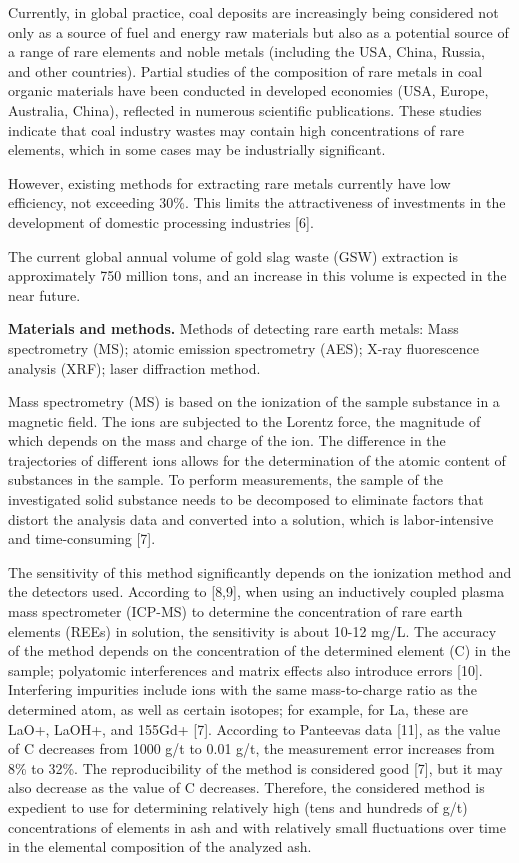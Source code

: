 \begin{multicols}{2}
Currently, in global practice, coal deposits are increasingly being
considered not only as a source of fuel and energy raw materials but
also as a potential source of a range of rare elements and noble metals
(including the USA, China, Russia, and other countries). Partial studies
of the composition of rare metals in coal organic materials have been
conducted in developed economies (USA, Europe, Australia, China),
reflected in numerous scientific publications. These studies indicate
that coal industry wastes may contain high concentrations of rare
elements, which in some cases may be industrially significant.

However, existing methods for extracting rare metals currently have low
efficiency, not exceeding 30\%. This limits the attractiveness of
investments in the development of domestic processing industries
{[}6{]}.

The current global annual volume of gold slag waste (GSW) extraction is
approximately 750 million tons, and an increase in this volume is
expected in the near future.

{\bfseries Materials and methods.} Methods of detecting rare earth metals:
Mass spectrometry (MS); atomic emission spectrometry (AES); X-ray
fluorescence analysis (XRF); laser diffraction method.

Mass spectrometry (MS) is based on the ionization of the sample
substance in a magnetic field. The ions are subjected to the Lorentz
force, the magnitude of which depends on the mass and charge of the ion.
The difference in the trajectories of different ions allows for the
determination of the atomic content of substances in the sample. To
perform measurements, the sample of the investigated solid substance
needs to be decomposed to eliminate factors that distort the analysis
data and converted into a solution, which is labor-intensive and
time-consuming {[}7{]}.

The sensitivity of this method significantly depends on the ionization
method and the detectors used. According to {[}8,9{]}, when using an
inductively coupled plasma mass spectrometer (ICP-MS) to determine the
concentration of rare earth elements (REEs) in solution, the sensitivity
is about 10-12 mg/L. The accuracy of the method depends on the
concentration of the determined element (C) in the sample; polyatomic
interferences and matrix effects also introduce errors {[}10{]}.
Interfering impurities include ions with the same mass-to-charge ratio
as the determined atom, as well as certain isotopes; for example, for
La, these are LaO+, LaOH+, and 155Gd+ {[}7{]}. According to
Panteeva\textquotesingle s data {[}11{]}, as the value of C decreases
from 1000 g/t to 0.01 g/t, the measurement error increases from 8\% to
32\%. The reproducibility of the method is considered good {[}7{]}, but
it may also decrease as the value of C decreases. Therefore, the
considered method is expedient to use for determining relatively high
(tens and hundreds of g/t) concentrations of elements in ash and with
relatively small fluctuations over time in the elemental composition of
the analyzed ash.
\end{multicols}

